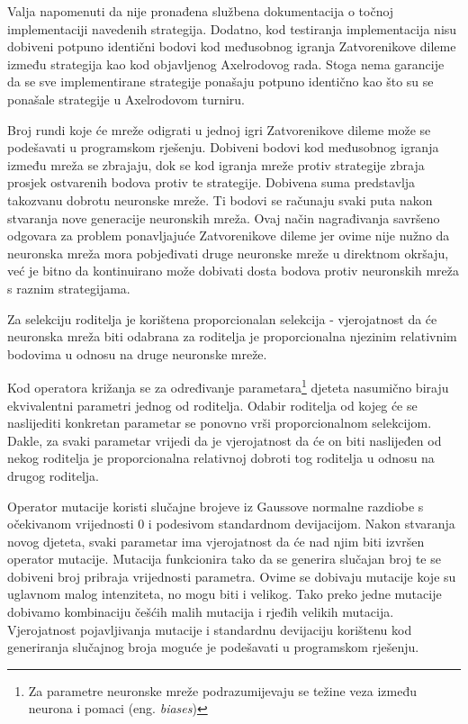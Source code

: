\documentclass[zavrsnirad]{fer}
\begin{document}
		Valja napomenuti da nije pronađena službena dokumentacija o točnoj implementaciji navedenih strategija. Dodatno, kod testiranja implementacija nisu dobiveni potpuno identični bodovi kod međusobnog igranja Zatvorenikove dileme između strategija kao kod objavljenog Axelrodovog rada. Stoga nema garancije da se sve implementirane strategije ponašaju potpuno identično kao što su se ponašale strategije u Axelrodovom turniru.
		
		Broj rundi koje će mreže odigrati u jednoj igri Zatvorenikove dileme može se podešavati u programskom rješenju. Dobiveni bodovi kod međusobnog igranja između mreža se zbrajaju, dok se kod igranja mreže protiv strategije zbraja prosjek ostvarenih bodova protiv te strategije. Dobivena suma predstavlja takozvanu dobrotu neuronske mreže. Ti bodovi se računaju svaki puta nakon stvaranja nove generacije neuronskih mreža. Ovaj način nagrađivanja savršeno odgovara za problem ponavljajuće Zatvorenikove dileme jer ovime nije nužno da neuronska mreža mora pobjeđivati druge neuronske mreže u direktnom okršaju, već je bitno da kontinuirano može dobivati dosta bodova protiv neuronskih mreža s raznim strategijama.
		
		Za selekciju roditelja je korištena proporcionalan selekcija - vjerojatnost da će neuronska mreža biti odabrana za roditelja je proporcionalna njezinim relativnim bodovima u odnosu na druge neuronske mreže.
		
		Kod operatora križanja se za određivanje parametara\footnote{Za parametre neuronske mreže podrazumijevaju se težine veza između neurona i pomaci (eng. \textit{biases})} djeteta nasumično biraju ekvivalentni parametri jednog od roditelja. Odabir roditelja od kojeg će se naslijediti konkretan parametar se ponovno vrši proporcionalnom selekcijom. Dakle, za svaki parametar vrijedi da je vjerojatnost da će on biti naslijeđen od nekog roditelja je proporcionalna relativnoj dobroti tog roditelja u odnosu na drugog roditelja.
		
		Operator mutacije koristi slučajne brojeve iz Gaussove normalne razdiobe s očekivanom vrijednosti 0 i podesivom standardnom devijacijom. Nakon stvaranja novog djeteta, svaki parametar ima vjerojatnost da će nad njim biti izvršen operator mutacije. Mutacija funkcionira tako da se generira slučajan broj te se dobiveni broj pribraja vrijednosti parametra. Ovime se dobivaju mutacije koje su uglavnom malog intenziteta, no mogu biti i velikog. Tako preko jedne mutacije dobivamo kombinaciju češćih malih mutacija i rjeđih velikih mutacija. Vjerojatnost pojavljivanja mutacije i standardnu devijaciju korištenu kod generiranja slučajnog broja moguće je podešavati u programskom rješenju.
		
\end{document}
